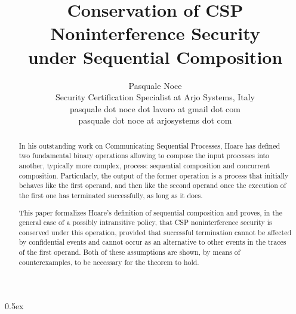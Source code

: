 \documentclass[11pt,a4paper]{article}
\begin{document}
\title{Conservation of CSP Noninterference Security\\under Sequential Composition}
\author{Pasquale Noce\\Security Certification Specialist at Arjo Systems, Italy\\pasquale dot noce dot lavoro at gmail dot com\\pasquale dot noce at arjosystems dot com}
\maketitle

\begin{abstract}
In his outstanding work on Communicating Sequential Processes, Hoare has defined
two fundamental binary operations allowing to compose the input processes into
another, typically more complex, process: sequential composition and concurrent
composition. Particularly, the output of the former operation is a process that
initially behaves like the first operand, and then like the second operand once
the execution of the first one has terminated successfully, as long as it does.

This paper formalizes Hoare's definition of sequential composition and proves,
in the general case of a possibly intransitive policy, that CSP noninterference
security is conserved under this operation, provided that successful termination
cannot be affected by confidential events and cannot occur as an alternative to
other events in the traces of the first operand. Both of these assumptions are
shown, by means of counterexamples, to be necessary for the theorem to hold.
\end{abstract}

\tableofcontents

\parindent 0pt\parskip 0.5ex





\end{document}
